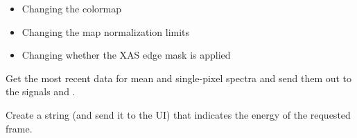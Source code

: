 \documentclass[letterpaper,10pt,english]{sphinxmanual}
\begin{document}
\begin{fulllineitems}
\begin{fulllineitems}
\begin{itemize}
\item {} 
Changing the colormap

\item {} 
Changing the map normalization limits

\item {} 
Changing whether the XAS edge mask is applied

\end{itemize}

\end{fulllineitems}


\begin{fulllineitems}
\label{\detokenize{xanespy:xanespy.qt_frameset_presenter.QtFramesetPresenter.update_spectra}}
Get the most recent data for mean and single-pixel spectra and send
them out to the signals  and
.

\end{fulllineitems}


\begin{fulllineitems}
\label{\detokenize{xanespy:xanespy.qt_frameset_presenter.QtFramesetPresenter.update_status_frame}}
Create a string (and send it to the UI) that indicates the energy
of the requested frame.

\end{fulllineitems}


\begin{fulllineitems}
\label{\detokenize{xanespy:xanespy.qt_frameset_presenter.QtFramesetPresenter.update_status_shape}}
\end{fulllineitems}


\begin{fulllineitems}
\label{\detokenize{xanespy:xanespy.qt_frameset_presenter.QtFramesetPresenter.update_status_unit}}
\end{fulllineitems}


\end{fulllineitems}
\end{document}
